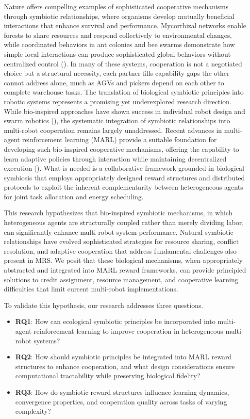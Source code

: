 \documentclass[Afour,sageh,times]{sagej}
\begin{document}
Nature offers compelling examples of sophisticated cooperative mechanisms through symbiotic relationships, where organisms develop mutually beneficial interactions that enhance survival and performance. Mycorrhizal networks enable forests to share resources and respond collectively to environmental changes, while coordinated behaviors in ant colonies and bee swarms demonstrate how simple local interactions can produce sophisticated global behaviors without centralized control (\cite{simard2012Mycorrhizal, bonabeau1999Swarm}). In many of these systems, cooperation is not a negotiated choice but a structural necessity, each partner fills capability gaps the other cannot address alone, much as AGVs and pickers depend on each other to complete warehouse tasks. The translation of biological symbiotic principles into robotic systems represents a promising yet underexplored research direction. While bio-inspired approaches have shown success in individual robot design and swarm robotics (\cite{brambilla2013Swarm}), the systematic integration of symbiotic relationships into multi-robot cooperation remains largely unaddressed. Recent advances in multi-agent reinforcement learning (MARL) provide a suitable foundation for developing such bio-inspired cooperative mechanisms, offering the capability to learn adaptive policies through interaction while maintaining decentralized execution (\cite{foerster2018Counterfactuala}). What is needed is a collaborative framework grounded in biological symbiosis that employs appropriately designed reward structures and distributed protocols to exploit the inherent complementarity between heterogeneous agents for joint task allocation and energy scheduling.

This research hypothesizes that bio-inspired symbiotic mechanisms, in which heterogeneous agents are structurally coupled rather than merely dividing labor, can significantly enhance multi-robot system performance. Natural symbiotic relationships have evolved sophisticated strategies for resource sharing, conflict resolution, and adaptive cooperation that address fundamental challenges also present in MRS. We posit that these biological mechanisms, when appropriately abstracted and integrated into MARL reward frameworks, can provide principled solutions to credit assignment, resource management, and cooperative learning difficulties that limit current multi-robot implementations.

To validate this hypothesis, our research addresses three questions. 
\begin{itemize}
    \item \textbf{RQ1}: How can ecological symbiotic principles be incorporated into multi-agent reinforcement learning to improve cooperation in heterogeneous multi-robot systems?
    \item \textbf{RQ2}: How should symbiotic principles be integrated into MARL reward structures to enhance cooperation, and what design considerations ensure computational tractability while preserving biological fidelity?
    \item \textbf{RQ3}: How do symbiotic reward structures influence learning dynamics, convergence properties, and cooperation quality across tasks of varying complexity?
\end{itemize}
\end{document}
